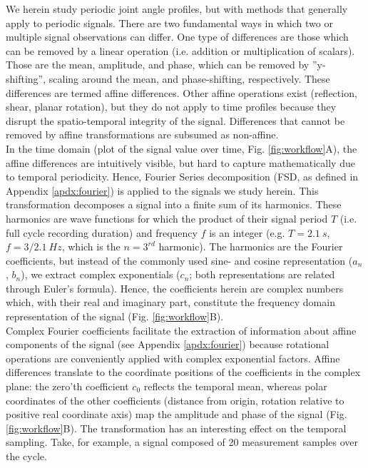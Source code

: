 \documentclass[10pt, a4paper]{article}
\begin{document}
We herein study periodic joint angle profiles, but with methods that generally apply to periodic signals. 
There are two fundamental ways in which two or multiple signal observations can differ. 
One type of differences are those which can be removed by a linear operation (i.e. addition or multiplication of scalars). 
Those are the mean, amplitude, and phase, which can be removed by ''y-shifting'', scaling around the mean, and phase-shifting, respectively. 
These differences are termed affine differences. 
Other affine operations exist (reflection, shear, planar rotation), but they do not apply to time profiles because they disrupt the spatio-temporal integrity of the signal. 
Differences that cannot be removed by affine transformations are subsumed as non-affine. 
\\In the time domain (plot of the signal value over time, Fig. \ref{fig:workflow}A), the affine differences are intuitively visible, but hard to capture mathematically due to temporal periodicity. 
Hence, Fourier Series decomposition (FSD, as defined in Appendix \ref{apdx:fourier}) is applied to the signals we study herein. 
This transformation decomposes a signal into a finite sum of its harmonics. 
These harmonics are wave functions for which the product of their signal period $T$ (i.e. full cycle recording duration) and frequency $f$ is an integer (e.g. $T = 2.1\ s$, $f = 3/2.1\ Hz$, which is the $n=3^{rd}$ harmonic). 
The harmonics are the Fourier coefficients, but instead of the commonly used sine- and cosine representation ($a_{n}$, $b_{n}$), we extract complex exponentials ($c_{n}$; both representations are related through Euler's formula). 
Hence, the coefficients herein are complex numbers which, with their real and imaginary part, constitute the frequency domain representation of the signal (Fig. \ref{fig:workflow}B). 
\\Complex Fourier coefficients facilitate the extraction of information about affine components of the signal (see Appendix \ref{apdx:fourier}) because rotational operations are conveniently applied with complex exponential factors. 
Affine differences translate to the coordinate positions of the coefficients in the complex plane: the zero'th coefficient $c_{0}$ reflects the temporal mean, whereas polar coordinates of the other coefficients  (distance from origin, rotation relative to positive real coordinate axis) map the amplitude and phase of the signal (Fig. \ref{fig:workflow}B). 
The transformation has an interesting effect on the temporal sampling. 
Take, for example, a signal composed of 20 measurement samples over the cycle. 
\end{document}
